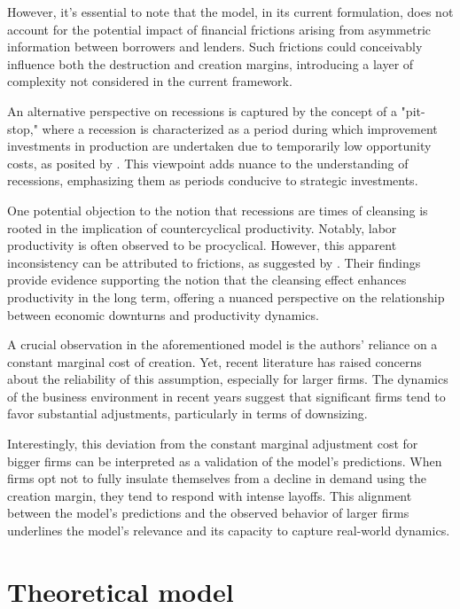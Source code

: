 \documentclass[12pt]{article}
\begin{document}
However, it's essential to note that the model, in its current formulation, does not account for the potential impact of
financial frictions arising from asymmetric information between borrowers and lenders. Such frictions could conceivably
influence both the destruction and creation margins, introducing a layer of complexity not considered in the current
framework. 

An alternative perspective on recessions is captured by the concept of a "pit-stop," where a recession is characterized
as a period during which improvement investments in production are undertaken due to temporarily low opportunity costs,
as posited by \cite{DAvHalt90}. This viewpoint adds nuance to the understanding of recessions, emphasizing them as
periods conducive to strategic investments. 

One potential objection to the notion that recessions are times of cleansing is rooted in the implication of
countercyclical productivity. Notably, labor productivity is often observed to be procyclical. However, this apparent
inconsistency can be attributed to frictions, as suggested by \cite{GaHam92}. Their findings provide evidence supporting
the notion that the cleansing effect enhances productivity in the long term, offering a nuanced perspective on the
relationship between economic downturns and productivity dynamics. 
\par
A crucial observation in the aforementioned model is the authors' reliance on a constant marginal cost of creation. Yet,
recent literature has raised concerns about the reliability of this assumption, especially for larger firms. The
dynamics of the business environment in recent years suggest that significant firms tend to favor substantial
adjustments, particularly in terms of downsizing. 
\par
Interestingly, this deviation from the constant marginal adjustment cost for bigger firms can be interpreted as a
validation of the model's predictions. When firms opt not to fully insulate themselves from a decline in demand using
the creation margin, they tend to respond with intense layoffs. This alignment between the model's predictions and the
observed behavior of larger firms underlines the model's relevance and its capacity to capture real-world dynamics. 

\section{Theoretical model}
\end{document}
